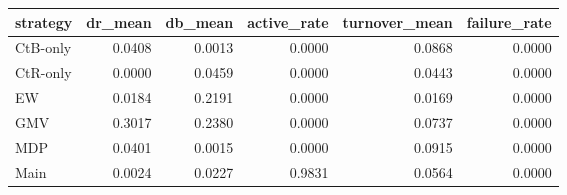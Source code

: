 \begin{tabular}{lrrrrr}
\toprule
strategy & dr_mean & db_mean & active_rate & turnover_mean & failure_rate \\
\midrule
CtB-only & 0.0408 & 0.0013 & 0.0000 & 0.0868 & 0.0000 \\
CtR-only & 0.0000 & 0.0459 & 0.0000 & 0.0443 & 0.0000 \\
EW & 0.0184 & 0.2191 & 0.0000 & 0.0169 & 0.0000 \\
GMV & 0.3017 & 0.2380 & 0.0000 & 0.0737 & 0.0000 \\
MDP & 0.0401 & 0.0015 & 0.0000 & 0.0915 & 0.0000 \\
Main & 0.0024 & 0.0227 & 0.9831 & 0.0564 & 0.0000 \\
\bottomrule
\end{tabular}
